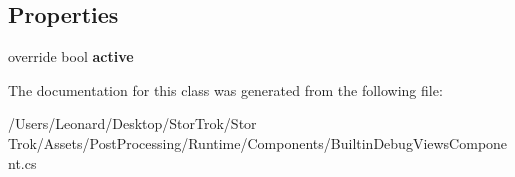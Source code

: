 \subsection*{Properties}
\begin{DoxyCompactItemize}
\item 
\mbox{\label{class_unity_engine_1_1_post_processing_1_1_builtin_debug_views_component_a278b64dc1a7dc3dfae9f829accb1592c}} 
override bool {\bfseries active}
\end{DoxyCompactItemize}


The documentation for this class was generated from the following file\+:\begin{DoxyCompactItemize}
\item 
/\+Users/\+Leonard/\+Desktop/\+Stor\+Trok/\+Stor Trok/\+Assets/\+Post\+Processing/\+Runtime/\+Components/Builtin\+Debug\+Views\+Component.\+cs\end{DoxyCompactItemize}
